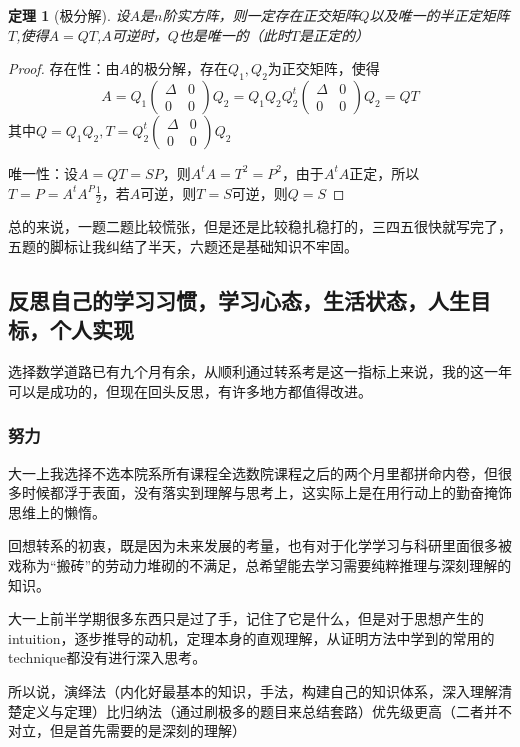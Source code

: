 \documentclass[12pt, a4paper, oneside]{ctexart}
\newtheorem{theorem}{定理}[section]
\begin{document}
\begin{theorem}[极分解]
    设$A$是$n$阶实方阵，则一定存在正交矩阵$Q$以及唯一的半正定矩阵$T$,使得$A=QT$,$A$可逆时，$Q$也是唯一的（此时$T$是正定的）
\end{theorem}
\begin{proof}
    存在性：由$A$的极分解，存在$Q_1,Q_2$为正交矩阵，使得
    $$ A=Q_1 \begin{pmatrix} \Delta  & 0 \\ 0 & 0 \end{pmatrix} Q_2=Q_1 Q_2 Q_2^{t}\begin{pmatrix} \Delta  & 0 \\ 0 & 0 \end{pmatrix}Q_2=QT$$
    其中$Q=Q_1 Q_2,T=Q_2^{t}\begin{pmatrix} \Delta  & 0 \\ 0 & 0 \end{pmatrix}Q_2$
    
    唯一性：设$A=QT=SP$，则$A^tA=T^2=P^2$，由于$A^tA$正定，所以$T=P=A^tA^P{\frac{1}{2}}$，若$A$可逆，则$T=S$可逆，则$Q=S$
\end{proof} 

总的来说，一题二题比较慌张，但是还是比较稳扎稳打的，三四五很快就写完了，五题的脚标让我纠结了半天，六题还是基础知识不牢固。
\newpage
\subsection{反思自己的学习习惯，学习心态，生活状态，人生目标，个人实现}

选择数学道路已有九个月有余，从顺利通过转系考是这一指标上来说，我的这一年可以是成功的，但现在回头反思，有许多地方都值得改进。

\subsubsection{努力}
大一上我选择不选本院系所有课程全选数院课程之后的两个月里都拼命内卷，但很多时候都浮于表面，没有落实到理解与思考上，这实际上是在用行动上的勤奋掩饰思维上的懒惰。

回想转系的初衷，既是因为未来发展的考量，也有对于化学学习与科研里面很多被戏称为“搬砖”的劳动力堆砌的不满足，总希望能去学习需要纯粹推理与深刻理解的知识。

大一上前半学期很多东西只是过了手，记住了它是什么，但是对于思想产生的intuition，逐步推导的动机，定理本身的直观理解，从证明方法中学到的常用的technique都没有进行深入思考。

所以说，演绎法（内化好最基本的知识，手法，构建自己的知识体系，深入理解清楚定义与定理）比归纳法（通过刷极多的题目来总结套路）优先级更高（二者并不对立，但是首先需要的是深刻的理解）
\end{document}
